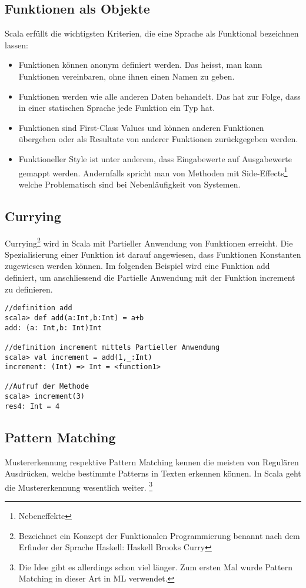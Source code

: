 \subsection{Funktionen als Objekte}
Scala erf\"ullt die wichtigsten Kriterien, die eine Sprache als Funktional bezeichnen lassen\cite[p. 28]{Piepmeyer201006}:
\begin{itemize}
\item Funktionen k\"onnen anonym definiert werden. Das heisst, man kann Funktionen vereinbaren, ohne ihnen einen Namen zu geben. 
\item Funktionen werden wie alle anderen Daten behandelt. Das hat zur Folge, dass in einer statischen Sprache jede Funktion ein Typ hat. 
\item Funktionen sind First-Class Values und k\"onnen anderen Funktionen \"ubergeben oder als Resultate von anderer Funktionen zur\"uckgegeben werden.
\item Funktioneller Style ist unter anderem, dass Eingabewerte auf Ausgabewerte gemappt werden. Andernfalls spricht man von Methoden mit Side-Effects\footnote{Nebeneffekte} welche Problematisch sind bei Nebenl\"aufigkeit von Systemen.
\end{itemize}
\subsection{Currying}
Currying\footnote{Bezeichnet ein Konzept der Funktionalen Programmierung benannt nach dem Erfinder der Sprache Haskell:  Haskell Brooks Curry} wird in Scala mit Partieller Anwendung von Funktionen erreicht. Die Spezialisierung einer Funktion ist darauf angewiesen, dass Funktionen Konstanten zugewiesen werden k\"onnen. Im folgenden Beispiel wird eine Funktion add definiert, um anschliessend die Partielle Anwendung mit der Funktion increment zu definieren.

\begin{lstlisting}[caption=Partielle Anwendung einer Funktion]
//definition add
scala> def add(a:Int,b:Int) = a+b
add: (a: Int,b: Int)Int

//definition increment mittels Partieller Anwendung
scala> val increment = add(1,_:Int)
increment: (Int) => Int = <function1>

//Aufruf der Methode
scala> increment(3)
res4: Int = 4
\end{lstlisting}


\subsection{Pattern Matching}
Mustererkennung respektive Pattern Matching kennen die meisten von Regul\"aren Ausdr\"ucken, welche bestimmte Patterns in Texten erkennen k\"onnen. In Scala geht die Mustererkennung wesentlich weiter. \footnote{Die Idee gibt es allerdings schon viel l\"anger. Zum ersten Mal wurde Pattern Matching in dieser Art in ML verwendet.}

